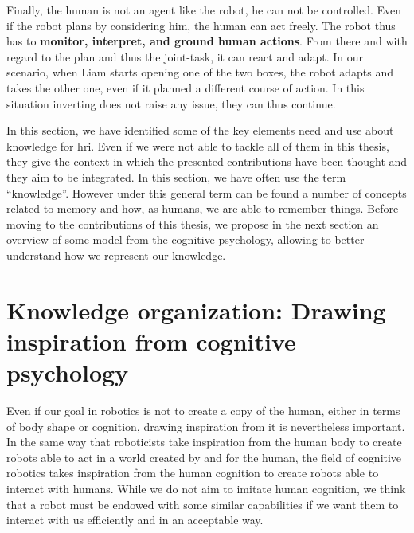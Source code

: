 Finally, the human is not an agent like the robot, he can not be controlled. Even if the robot plans by considering him, the human can act freely. The robot thus has to \textbf{monitor, interpret, and ground human actions}. From there and with regard to the plan and thus the joint-task, it can react and adapt. In our scenario, when Liam starts opening one of the two boxes, the robot adapts and takes the other one, even if it planned a different course of action. In this situation inverting does not raise any issue, they can thus continue.

In this section, we have identified some of the key elements need and use about knowledge for \acrfull{hri}. Even if we were not able to tackle all of them in this thesis, they give the context in which the presented contributions have been thought and they aim to be integrated. In this section, we have often use the term ``knowledge''. However under this general term can be found a number of concepts related to memory and how, as humans, we are able to remember things. Before moving to the contributions of this thesis, we propose in the next section an overview of some model from the cognitive psychology, allowing to better understand how we represent our knowledge.

\section[Knowledge organization]{Knowledge organization: Drawing inspiration from cognitive psychology }

Even if our goal in robotics is not to create a copy of the human, either in terms of body shape or cognition, drawing inspiration from it is nevertheless important. In the same way that roboticists take inspiration from the human body to create robots able to act in a world created by and for the human, the field of cognitive robotics takes inspiration from the human cognition to create robots able to interact with humans. While we do not aim to imitate human cognition, we think that a robot must be endowed with some similar capabilities if we want them to interact with us efficiently and in an acceptable way.

